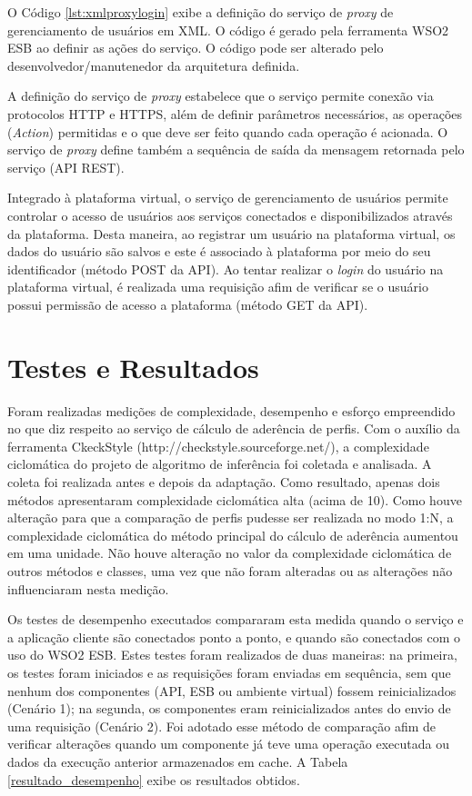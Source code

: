 O Código \ref{lst:xmlproxylogin} exibe a definição do serviço de \textit{proxy} de gerenciamento de usuários em XML. O código é gerado pela ferramenta WSO2 ESB ao definir as ações do serviço. O código pode ser alterado pelo desenvolvedor/manutenedor da arquitetura definida.

A definição do serviço de \textit{proxy} estabelece que o serviço permite conexão via protocolos HTTP e HTTPS, além de definir parâmetros necessários, as operações (\textit{Action}) permitidas e o que deve ser feito quando cada operação é acionada. O serviço de \textit{proxy} define também a sequência de saída da mensagem retornada pelo serviço (API REST).

Integrado à plataforma virtual, o serviço de gerenciamento de usuários permite controlar o acesso de usuários aos serviços conectados e disponibilizados através da plataforma. Desta maneira, ao registrar um usuário na plataforma virtual, os dados do usuário são salvos e este é associado à plataforma por meio do seu identificador (método POST da API). Ao tentar realizar o \textit{login} do usuário na plataforma virtual, é realizada uma requisição afim de verificar se o usuário possui permissão de acesso a plataforma (método GET da API).

\section{Testes e Resultados}
Foram realizadas medições de complexidade, desempenho e esforço empreendido no que diz respeito ao serviço de cálculo de aderência de perfis. Com o auxílio da ferramenta CkeckStyle (http://checkstyle.sourceforge.net/), a complexidade ciclomática do projeto de algoritmo de inferência foi coletada e analisada. A coleta foi realizada antes e depois da adaptação. Como resultado, apenas dois métodos apresentaram complexidade ciclomática alta (acima de 10). Como houve alteração para que a comparação de perfis pudesse ser realizada no modo 1:N, a complexidade ciclomática do método principal do cálculo de aderência aumentou em uma unidade. Não houve alteração no valor da complexidade ciclomática de outros métodos e classes, uma vez que não foram alteradas ou as alterações não influenciaram nesta medição.

Os testes de desempenho executados compararam esta medida quando o serviço e a aplicação cliente são conectados ponto a ponto, e quando são conectados com o uso do WSO2 ESB. Estes testes foram realizados de duas maneiras: na primeira, os testes foram iniciados e as requisições foram enviadas em sequência, sem que nenhum dos componentes (API, ESB ou ambiente virtual) fossem reinicializados (Cenário 1); na segunda, os componentes eram reinicializados antes do envio de uma requisição (Cenário 2). Foi adotado esse método de comparação afim de verificar alterações quando um componente já teve uma operação executada ou dados da execução anterior armazenados em cache. A Tabela \ref{resultado_desempenho} exibe os resultados obtidos.

